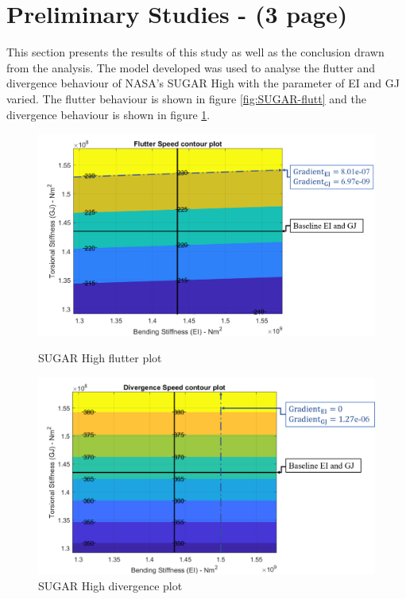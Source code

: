 \documentclass[11pt]{article}
\begin{document}
\section{Preliminary Studies - (3 page)}
\label{sec:prelim}
This section presents the results of this study as well as the conclusion drawn from the analysis. The model developed was used to analyse the flutter and divergence behaviour of NASA's SUGAR High with the parameter of EI and GJ varied. The flutter behaviour is shown in figure \ref{fig:SUGAR-flutt} and the divergence behaviour is shown in figure \ref{fig:SUGAR-div}.
\begin{figure}[!hbt]
    \begin{minipage}{.5\textwidth}
    \centering
    \includegraphics[width = \textwidth]{figures/flutter.png}
    \caption{SUGAR High flutter plot}
    \label{fig:SUGAR-flutt}
    \end{minipage}%
    \begin{minipage}{.5\textwidth}
    \centering
    \includegraphics[width = \textwidth]{figures/divergence.png}
    \caption{SUGAR High divergence plot}
    \label{fig:SUGAR-div}
    \end{minipage}
\end{figure}
\end{document}
